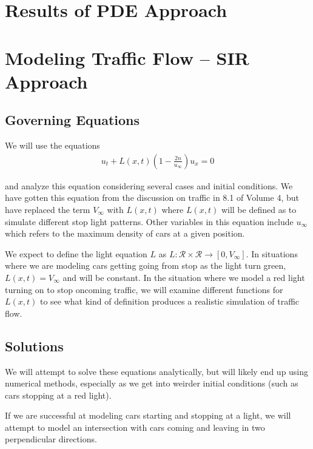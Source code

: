\documentclass[12pt]{article}
\begin{document}
\section{Results of PDE Approach}

\section{Modeling Traffic Flow – SIR Approach}

\subsection{Governing Equations} 
We will use the equations 
\begin{align*}
    u_t + L(x, t) ( 1 - \frac{2n}{u_\infty} ) u_x = 0 
\end{align*}

and analyze this equation considering several cases and initial conditions. We have gotten this equation from the discussion on traffic in 8.1 of Volume 4, but have replaced the term $V_\infty$ with $L(x, t)$ where $L(x, t)$ will be defined as to simulate different stop light patterns. Other variables in this equation include $u_\infty$ which refers to the maximum density of cars at a given position. 

We expect to define the light equation $L$ as $L : \mathcal{R} \times \mathcal{R} \to [0, V_\infty]$. In situations where we are modeling cars getting going from stop as the light turn green, $L(x, t) = V_\infty$ and will be constant. In the situation where we model a red light turning on to stop oncoming traffic, we will examine different functions for $L(x, t)$ to see what kind of definition produces a realistic simulation of traffic flow. 

\subsection{Solutions}

We will attempt to solve these equations analytically, but will likely end up using numerical methods, especially as we get into weirder initial conditions (such as cars stopping at a red light). 

If we are successful at modeling cars starting and stopping at a light, we will attempt to model an intersection with cars coming and leaving in two perpendicular directions.

\end{document}
